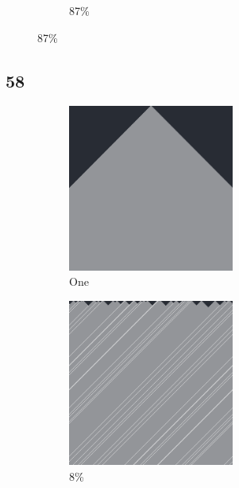 \documentclass[12pt, fleqn]{report}                             %
\theoremstyle{break}                                            %
\begin{document}
\begin{figure}[ht!]
\begin{subfigure}[b]{0.4\linewidth}
          \caption{87\%}
        \end{subfigure}
      \end{figure}


      \clearpage
      \subsection{58}
      \begin{figure}[ht!]
        \centering
        \begin{subfigure}[b]{0.4\linewidth}
          \includegraphics[width=0.6\textwidth]{Images/58/a.png}
          \caption{One}
        \end{subfigure}
        \begin{subfigure}[b]{0.4\linewidth}
          \includegraphics[width=0.6\textwidth]{Images/58/b.png}
          \caption{8\%}
        \end{subfigure}
        \begin{subfigure}[b]{0.4\linewidth}

\end{subfigure}
\end{figure}
\end{document}
